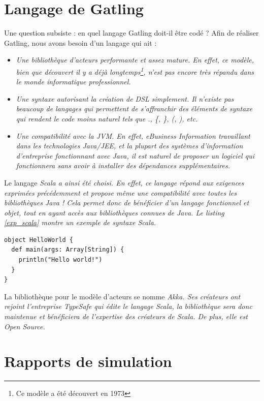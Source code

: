 \section{Langage de Gatling}
Une question subsiste : en quel langage Gatling doit-il être codé ? Afin de réaliser Gatling, nous avons besoin d'un langage qui ait :
\begin{itemize}
  \item \em{Une bibliothèque d'acteurs performante et assez mature}. En effet, ce modèle, bien que découvert il y a déjà longtemps\footnote{Ce modèle a été découvert en 1973\cite{actor_model_en}}, n'est pas encore très répandu dans le monde informatique professionnel.
  \item \em{Une syntaxe autorisant la création de DSL simplement}. Il n'existe pas beaucoup de langages qui permettent de s'affranchir des éléments de syntaxe qui rendent le code moins naturel tels que ., \{, \}, (, ), etc.
  \item \em{Une compatibilité avec la JVM}. En effet, eBusiness Information travaillant dans les technologies Java/JEE, et la plupart des systèmes d'information d'entreprise fonctionnant avec Java, il est naturel de proposer un logiciel qui fonctionnera sans avoir à installer des dépendances supplémentaires.
\end{itemize}

Le langage \em{Scala}\cite{www_scala} a ainsi été choisi. En effet, ce langage répond aux exigences exprimées précédemment et propose même une compatibilité avec toutes les bibliothèques Java ! Cela permet donc de bénéficier d'un langage fonctionnel et objet, tout en ayant accès aux bibliothèques connues de Java. Le listing \ref{exp_scala} montre un exemple de syntaxe Scala.

\begin{lstlisting}[caption={Exemple de code Scala},label=exp_scala]
object HelloWorld {
  def main(args: Array[String]) {
    println("Hello world!")
  }
}
\end{lstlisting}

La bibliothèque pour le modèle d'acteurs se nomme \em{Akka}\cite{www_akka}. Ses créateurs ont rejoint l'entreprise TypeSafe qui édite le langage Scala, la bibliothèque sera donc maintenue et bénéficiera de l'expertise des créateurs de Scala. De plus, elle est Open Source.

\section{Rapports de simulation}

